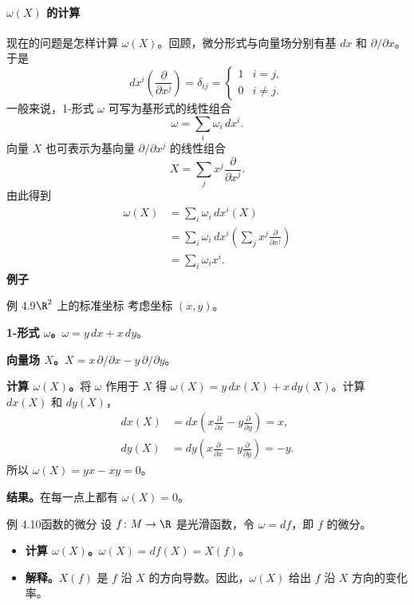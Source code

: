 \paragraph{\texorpdfstring{$\omega(X)$ 的计算}{ω(X) 的计算}}
现在的问题是怎样计算 $\omega(X)$。回顾，微分形式与向量场分别有基 $dx$ 和 $\partial/\partial x$。于是
\[
  dx^i\!\left(\frac{\partial}{\partial x^j}\right)=\delta_{ij}=
    \begin{cases}1&i=j,\\0&i\ne j.\end{cases}
\]
一般来说，1-形式 $\omega$ 可写为基形式的线性组合
\[
  \omega=\sum_i\omega_i\,dx^i.
\]
向量 $X$ 也可表示为基向量 $\partial/\partial x^j$ 的线性组合
\[
  X=\sum_j x^j\frac{\partial}{\partial x^j}.
\]
由此得到
\[
  \begin{aligned}
    \omega(X)&=\sum_i\omega_i\,dx^i(X)\\
      &=\sum_i\omega_i\,dx^i\!\left(\sum_j x^j\frac{\partial}{\partial x^j}\right)\\
      &=\sum_i\omega_i x^i.
  \end{aligned}
\]
\textbf{例子}

\begin{statement}{例 4.9}{$\R^2$ 上的标准坐标}
考虑坐标 $(x,y)$。

\textbf{1-形式 $\omega$。}$\omega=y\,dx+x\,dy$。

\textbf{向量场 $X$。}$X=x\,\partial/\partial x-y\,\partial/\partial y$。

\textbf{计算 $\omega(X)$。}将 $\omega$ 作用于 $X$ 得 $\omega(X)=y\,dx(X)+x\,dy(X)$。计算 $dx(X)$ 和 $dy(X)$，
\[
  \begin{aligned}
    dx(X)&=dx\!\left(x\frac{\partial}{\partial x}-y\frac{\partial}{\partial y}\right)=x,\\
    dy(X)&=dy\!\left(x\frac{\partial}{\partial x}-y\frac{\partial}{\partial y}\right)=-y.
  \end{aligned}
\]
所以 $\omega(X)=yx-xy=0$。

\textbf{结果。}在每一点上都有 $\omega(X)=0$。
\end{statement}

\begin{statement}{例 4.10}{函数的微分}
设 $f\colon M\to\R$ 是光滑函数，令 $\omega=df$，即 $f$ 的微分。
\begin{itemize}
  \item \textbf{计算 $\omega(X)$。}$\omega(X)=df(X)=X(f)$。
  \item \textbf{解释。}$X(f)$ 是 $f$ 沿 $X$ 的方向导数。因此，$\omega(X)$ 给出 $f$ 沿 $X$ 方向的变化率。
\end{itemize}
\end{statement}

